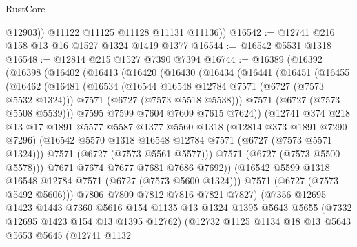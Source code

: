 \begin{lexlean}{RustCore}
\begin{coremodule}
            @12903))
        @11122
        @11125
        @11128
        @11131
        @11136))
@16542 := @12741 @216 @158 @13 @16 @1527 @1324 @1419 @1377
@16544 := @16542 @5531 @1318
@16548 := @12814 @215 @1527 @7390 @7394
@16744 := @16389
    (@16392
      (@16398
        (@16402
          (@16413
            (@16420
              (@16430
                (@16434
                  (@16441
                    (@16451
                      (@16455
                        (@16462
                          (@16481
                            (@16534
                              (@16544 @16548 @12784 @7571 (@6727 (@7573 @5532 @1324)))
                              @7571
                              (@6727 (@7573 @5518 @5538)))
                            @7571
                            (@6727 (@7573 @5508 @5539)))
                          @7595
                          @7599
                          @7604
                          @7609
                          @7615
                          @7624))
                      (@12741
                        @374
                        @218
                        @13
                        @17
                        @1891
                        @5577
                        @5587
                        @1377
                        @5560
                        @1318
                        (@12814 @373 @1891 @7290 @7296)
                        (@16542 @5570 @1318 @16548 @12784 @7571 (@6727 (@7573 @5571 @1324)))
                        @7571
                        (@6727 (@7573 @5561 @5577)))
                      @7571
                      (@6727 (@7573 @5500 @5578)))
                    @7671
                    @7674
                    @7677
                    @7681
                    @7686
                    @7692))
                (@16542 @5599 @1318 @16548 @12784 @7571 (@6727 (@7573 @5600 @1324)))
                @7571
                (@6727 (@7573 @5492 @5606)))
              @7806
              @7809
              @7812
              @7816
              @7821
              @7827)
            (@7356
              @12695
              @1423
              @1443
              @7360
              @5616
              @154
              @1135
              @13
              @1324
              @1395
              @5643
              @5655
              (@7332 @12695 @1423 @154 @13 @1395 @12762)
              (@12732
                @1125
                @1134
                @18
                @13
                @5643
                @5653
                @5645
                (@12741
                  @1132

\end{coremodule}
\end{lexlean}
